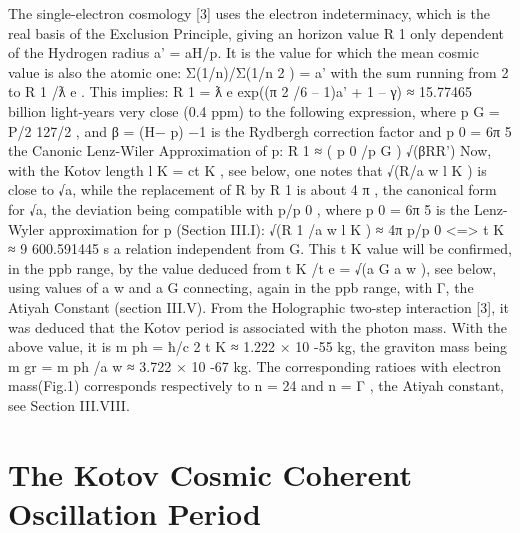 The single-electron cosmology [3] uses the electron indeterminacy, which is the real basis of the
Exclusion Principle, giving an horizon value R 1 only dependent of the Hydrogen radius a' = aH/p. It
is the value for which the mean cosmic value is also the atomic one:
Σ(1/n)/Σ(1/n 2 ) = a'
with the sum running from 2 to R 1 /ƛ e . This implies:
R 1 = ƛ e exp((π 2 /6 – 1)a' + 1 – γ) ≈ 15.77465 billion light-years
very close (0.4 ppm) to the following expression, where p G = P/2 127/2 , and β = (Η− p) −1 is the
Rydbergh correction factor and p 0 = 6π 5 the Canonic Lenz-Wiler Approximation of p:
R 1 ≈ ( p 0 /p G ) √(βRR')
Now, with the Kotov length l K = ct K , see below, one notes that √(R/a w l K ) is close to √a, while
the replacement of R by R 1 is about 4 π , the canonical form for √a, the deviation being compatible
with p/p 0 , where p 0 = 6π 5 is the Lenz-Wyler approximation for p (Section III.I):
√(R 1 /a w l K ) ≈ 4π p/p 0
<=>
t K ≈ 9 600.591445 s
a relation independent from G. This t K value will be confirmed, in the ppb range, by the value
deduced from t K /t e = √(a G a w ), see below, using values of a w and a G connecting, again in the ppb
range, with Γ, the Atiyah Constant (section III.V).
From the Holographic two-step interaction [3], it was deduced that the Kotov period is
associated with the photon mass. With the above value, it is m ph = ħ/c 2 t K ≈ 1.222 × 10 -55 kg, the
graviton mass being m gr = m ph /a w ≈ 3.722 × 10 -67 kg. The corresponding ratioes with electron mass(Fig.1) corresponds respectively to n = 24 and n = Γ , the Atiyah constant, see Section III.VIII.

\section {The Kotov Cosmic Coherent Oscillation Period}

